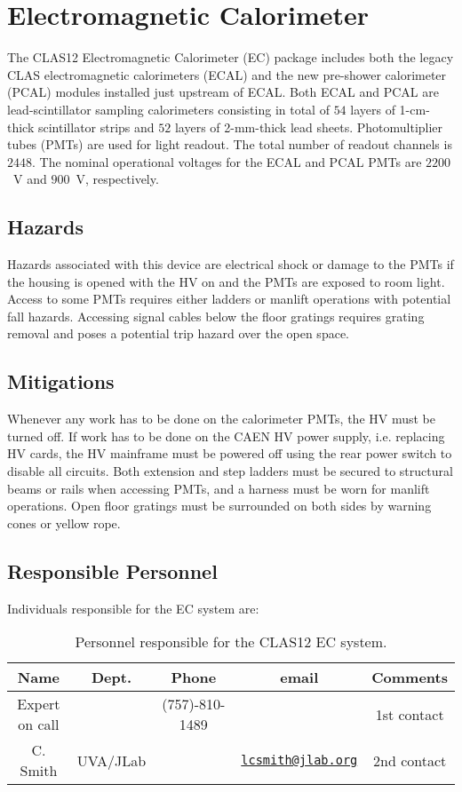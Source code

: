 \section{Electromagnetic Calorimeter}

The CLAS12 Electromagnetic Calorimeter (EC) package includes both the legacy CLAS 
electromagnetic calorimeters (ECAL) and the new pre-shower calorimeter (PCAL) modules 
installed just upstream of ECAL. Both ECAL and PCAL are lead-scintillator sampling 
calorimeters consisting in total of $54$ layers of 1-cm-thick scintillator strips and 
$52$ layers of 2-mm-thick lead sheets. Photomultiplier tubes (PMTs) are used for light 
readout. The total number of readout channels is $2448$. The nominal operational voltages 
for the ECAL and PCAL PMTs are $2200$~V and $900$~V, respectively. 

\subsection{Hazards} 

Hazards associated with this device are electrical shock or damage to the PMTs if the 
housing is opened with the HV on and the PMTs are exposed to room light.  Access to some 
PMTs requires either ladders or manlift operations with potential fall hazards. Accessing 
signal cables below the floor gratings requires grating removal and poses a potential trip 
hazard over the open space. 

\subsection{Mitigations}

Whenever any work has to be done on the calorimeter PMTs, the HV must be turned off. If work 
has to be done on the CAEN HV power supply, i.e. replacing HV cards, the HV mainframe must 
be powered off using the rear power switch to disable all circuits. Both extension and step 
ladders must be secured to structural beams or rails when accessing PMTs, and a harness must 
be worn for manlift operations. Open floor gratings must be surrounded on both sides by 
warning cones or yellow rope.       

\subsection{Responsible Personnel}

Individuals responsible for the EC system are:

\begin{table}[!htb]
\centering
\begin{tabular}{|c|c|c|c|c|} \hline
Name&Dept.&Phone&email&Comments \\ \hline
Expert on call& &(757)-810-1489&& 1st contact \\ \hline
C. Smith &UVA/JLab&&\href{mailto:lcsmith@jlab.org}{\nolinkurl{lcsmith@jlab.org}}&2nd contact \\ \hline
\end{tabular}
\caption{Personnel responsible for the CLAS12 EC system.} 
\label{tb:ec}
\end{table}

